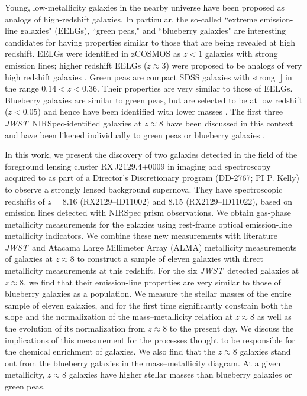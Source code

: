 \documentclass[twocolumn]{aastex631}
\newcommand{\jwst}{{\em JWST}}
\begin{document}
Young, low-metallicity galaxies in the nearby universe have been proposed as analogs of high-redshift galaxies. In particular, the so-called ``extreme emission-line galaxies" (EELGs), ``green peas," and ``blueberry galaxies" are interesting candidates for having properties similar to those that are being revealed at high redshift. EELGs \citep{eelgs} were identified in zCOSMOS as $z < 1$ galaxies with strong emission lines; higher redshift EELGs ($z\approx3$) were proposed to be analogs of very high redshift galaxies \citep{2017NatAs...1E..52A}. Green peas \citep{2009MNRAS.399.1191C, yang+2017g} are compact SDSS galaxies with strong [] in the range $0.14<z<0.36$. Their properties are very similar to those of EELGs. Blueberry galaxies are similar to green peas, but are selected to be at low redshift ($z<0.05$) and hence have been identified with lower masses \citep{yang+2017b}.
The first three \jwst\ NIRSpec-identified galaxies at $z\approx 8$ have been discussed in this context and have been likened individually to green peas or blueberry galaxies \citep{schaerer+2022,2022ApJ...939L...3T,2022arXiv220713020R,2023MNRAS.518..592K}.

In this work, we present the discovery of two galaxies detected in the field of the foreground lensing cluster RX\,J2129.4$+$0009 in imaging and spectroscopy acquired to as part of a Director's Discretionary program (DD-2767; PI P. Kelly) to observe a strongly lensed background supernova. They have spectroscopic redshifts of 
$z =  8.16$ (RX2129--ID11002) and 8.15 (RX2129--ID11022), based on emission lines detected
with NIRSpec prism observations. We obtain gas-phase metallicity measurements for the galaxies
using rest-frame optical emission-line metallicity indicators. 
We combine these new measurements with literature \jwst\ and Atacama Large Millimeter Array (ALMA) metallicity measurements of galaxies at $z \approx 8$ to construct a sample of eleven galaxies with direct metallicity measurements at this redshift. 
For the six \jwst\ detected galaxies at $z\approx8$, we find that their emission-line properties are very similar to those of blueberry galaxies as a population.
We measure the stellar masses of the entire sample of eleven galaxies, and for the first time significantly constrain both the slope and the normalization of the mass--metallicity relation at $z \approx 8$ as well as the evolution of its normalization from $z \approx 8$ to the present day. We discuss the implications of this measurement for the processes thought to be responsible for the chemical enrichment of galaxies.
We also find that the $z \approx 8$ galaxies stand out from the blueberry galaxies in the mass--metallicity diagram. At a given metallicity, $z\approx8$ galaxies have higher stellar masses than blueberry galaxies or green peas. 
\end{document}
